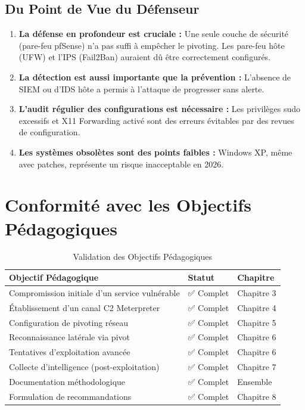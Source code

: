 \documentclass[12pt,a4paper,openany]{report}
\newcommand{\tableheadcolor}{\rowcolor{tableheadbg}}
\begin{document}
	\subsection{Du Point de Vue du Défenseur}
	
	\begin{enumerate}
		\item \textbf{La défense en profondeur est cruciale :} Une seule couche de sécurité (pare-feu pfSense) n'a pas suffi à empêcher le pivoting. Les pare-feu hôte (UFW) et l'IPS (Fail2Ban) auraient dû être correctement configurés.
		
		\item \textbf{La détection est aussi importante que la prévention :} L'absence de SIEM ou d'IDS hôte a permis à l'attaque de progresser sans alerte.
		
		\item \textbf{L'audit régulier des configurations est nécessaire :} Les privilèges sudo excessifs et X11 Forwarding activé sont des erreurs évitables par des revues de configuration.
		
		\item \textbf{Les systèmes obsolètes sont des points faibles :} Windows XP, même avec patches, représente un risque inacceptable en 2026.
	\end{enumerate}
	
	\section{Conformité avec les Objectifs Pédagogiques}
	
	\begin{table}[H]
		\centering
		\renewcommand{\arraystretch}{1.4}
		\setlength{\arrayrulewidth}{0.5pt}
		\begin{tabular}{p{7cm} >{\centering\arraybackslash}p{2.5cm} p{3cm}}
			\arrayrulecolor{tableborder}
			\hline
			\tableheadcolor
			\textcolor{tableheadfg}{\textbf{Objectif Pédagogique}} &
			\textcolor{tableheadfg}{\textbf{Statut}} &
			\textcolor{tableheadfg}{\textbf{Chapitre}} \\
			\hline
			\rowcolor{tablerowalt}
			Compromission initiale d'un service vulnérable & ✅ Complet & Chapitre 3 \\
			Établissement d'un canal C2 Meterpreter & ✅ Complet & Chapitre 4 \\
			\rowcolor{tablerowalt}
			Configuration de pivoting réseau & ✅ Complet & Chapitre 5 \\
			Reconnaissance latérale via pivot & ✅ Complet & Chapitre 6 \\
			\rowcolor{tablerowalt}
			Tentatives d'exploitation avancée & ✅ Complet & Chapitre 6 \\
			Collecte d'intelligence (post-exploitation) & ✅ Complet & Chapitre 7 \\
			\rowcolor{tablerowalt}
			Documentation méthodologique & ✅ Complet & Ensemble \\
			Formulation de recommandations & ✅ Complet & Chapitre 8 \\
			\hline
		\end{tabular}
		\caption{Validation des Objectifs Pédagogiques}
		\label{tab:objectives-validation}
	\end{table}
	
\end{document}
